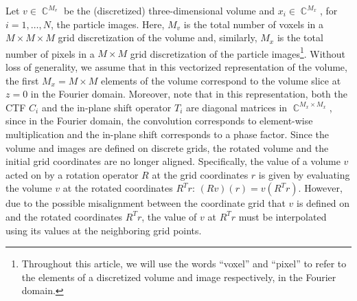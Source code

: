 \documentclass{article}
\DeclareMathOperator{\Cb}{\mathbb{C}}
\begin{document}
Let $v \in \Cb^{M_v}$ be the (discretized) three-dimensional volume and 
$x_i \in \Cb^{M_x}$, for $i=1,\ldots,N$, the particle images. Here, $M_v$ is the 
total number of voxels in a $M \times M \times M$ grid discretization of the volume 
and, similarly, $M_x$ is the total number of pixels in a $M \times M$ grid discretization 
of the particle images\footnote{
   Throughout this article, we will use the words ``voxel'' and ``pixel'' to refer
   to the elements of a discretized volume and image respectively, in the
   Fourier domain.
}. Without loss of generality, we assume that in this 
vectorized representation of the volume, the first $M_x = M \times M$
elements of the volume correspond to the volume slice at $z=0$ in the Fourier domain.
Moreover, note that in this representation, both the CTF $C_i$ and the in-plane
shift operator $T_i$ are diagonal matrices in $\Cb^{M_x \times M_x}$, since in 
the Fourier domain, the convolution corresponds to element-wise multiplication 
and the in-plane shift corresponds to a phase factor.
Since the volume and images are defined on discrete grids, 
the rotated volume and the initial grid coordinates are no longer aligned. 
Specifically, the value of a volume $v$ acted on by a rotation operator $R$ at
the grid coordinates $r$ is given by evaluating the volume $v$ at the rotated
coordinates $R^T r$: $(R v)(r) = v(R^T r)$. However, due to the possible misalignment
between the coordinate grid that $v$ is defined on and the rotated coordinates 
$R^T r$, the value of $v$ at $R^T r$ must be interpolated using its values at the
neighboring grid points. 
\end{document}
